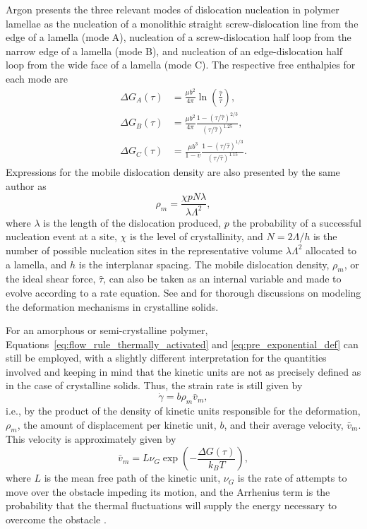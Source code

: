 Argon \citep{argonPhysicsDeformationFracture2013a} presents the three relevant modes of dislocation nucleation in polymer lamellae as the nucleation of a monolithic straight screw-dislocation line from the edge of a lamella (mode A), nucleation of a screw-dislocation half loop from the narrow edge of a lamella (mode B), and nucleation of an edge-dislocation half loop from the wide face of a lamella (mode C).
The respective free enthalpies for each mode are
\begin{align}
	\Delta G_A(\tau)&=\frac{\mu b^2}{4 \pi} \ln\left(\frac{\hat\tau}{\tau}\right),\\
	\Delta G_B(\tau)&=\frac{\mu b^2}{4 \pi} \frac{1-(\tau/\hat\tau)^{2 / 3}}{(\tau/\hat\tau)^{1.25} },\\
	\Delta G_C(\tau)&=\frac{\mu b^3}{1-v} \frac{1-(\tau/\hat\tau)^{1 / 3}}{(\tau/\hat\tau)^{1.15} }.
\end{align}
Expressions for the mobile dislocation density are also presented by the same author as
\begin{equation}
	\rho_m = \frac{\chi p N \lambda}{\lambda \Lambda^2},
\end{equation}
where $\lambda$ is the length of the dislocation produced, $p$ the probability of a successful nucleation event at a site, $\chi$ is the level of crystallinity, and $N = 2\Lambda/h$ is the number of possible nucleation sites in the representative volume $\lambda \Lambda^2$ allocated to a lamella, and $h$ is the interplanar spacing.
The mobile dislocation density, $\rho_m$, or the ideal shear force, $\hat\tau$, can also be taken as an internal variable and made to evolve according to a rate equation.
See \cite{klahn1970strain} and \cite{kocks1975thermodynamics} for thorough discussions on modeling the deformation mechanisms in crystalline solids.

For an amorphous or semi-crystalline polymer,  Equations~\eqref{eq:flow_rule_thermally_activated} and \eqref{eq:pre_exponential_def} can still be employed, with a slightly different interpretation for the quantities involved and keeping in mind that the kinetic units are not as precisely defined as in the case of crystalline solids.
Thus, the strain rate is still given by
\begin{equation}
  \label{eq:plaston_formula}
  \dot \gamma = b \rho_m \bar{v}_m,
\end{equation}
i.e., by the product of the density of kinetic units responsible for the deformation, $\rho_m$, the amount of displacement per kinetic unit, $b$, and their average velocity, $\bar v_m$.
This velocity is approximately given by
\begin{equation}
  \bar v_m = L \nu_G \exp\left(-\frac{\Delta G(\tau)}{k_B T}\right),
\end{equation}
where $L$ is the mean free path of the kinetic unit, $\nu_G$ is the rate of attempts to move over the obstacle impeding its motion, and the Arrhenius term is the probability that the thermal fluctuations will supply the energy necessary to overcome the obstacle \citep{gsellYieldTransientEffects1981, gilmanPLASTICWAVEMYTH1992}.

